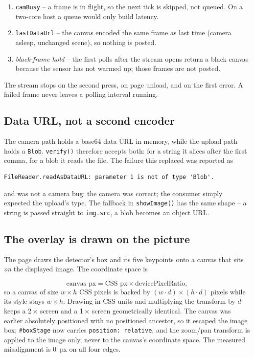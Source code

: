 \documentclass[11pt,a4paper]{article}
\newcommand{\coden}[1]{\texttt{\small #1}}
\begin{document}
\begin{enumerate}
  \item \coden{camBusy} -- a frame is in flight, so the next tick is
        skipped, not queued. On a two-core host a queue would only build
        latency.
  \item \coden{lastDataUrl} -- the canvas encoded the same frame as last
        time (camera asleep, unchanged scene), so nothing is posted.
  \item \emph{black-frame hold} -- the first polls after the stream opens
        return a black canvas because the sensor has not warmed up; those
        frames are not posted.
\end{enumerate}

The stream stops on the second press, on page unload, and on the first
error. A failed frame never leaves a polling interval running.

\subsection{Data URL, not a second encoder}

The camera path holds a base64 data URL in memory, while the upload path
holds a \coden{Blob}. \coden{verify()} therefore accepts both: for a string
it slices after the first comma, for a blob it reads the file. The
failure this replaced was reported as

\begin{lstlisting}
FileReader.readAsDataURL: parameter 1 is not of type 'Blob'.
\end{lstlisting}

and was not a camera bug: the camera was correct; the consumer simply
expected the upload's type. The fallback in \coden{showImage()} has the same
shape -- a string is passed straight to \coden{img.src}, a blob becomes an
object URL.

\subsection{The overlay is drawn on the picture}

The page draws the detector's box and its five keypoints onto a canvas
that sits \emph{on} the displayed image. The coordinate space is

\begin{equation}
  \text{canvas px} = \text{CSS px} \times \mathrm{devicePixelRatio},
\end{equation}
so a canvas of size $w\times h$ CSS pixels is backed by
$(w\cdot d)\times(h\cdot d)$ pixels while its style stays
$w\times h$. Drawing in CSS units and multiplying the transform by $d$
keeps a 2\,$\times$ screen and a 1\,$\times$ screen geometrically identical.
The canvas was earlier absolutely positioned with no positioned ancestor,
so it escaped the image box; \coden{\#boxStage} now carries
\coden{position: relative}, and the zoom/pan transform is applied to the
image only, never to the canvas's coordinate space. The measured
misalignment is $0$~px on all four edges.
\end{document}
